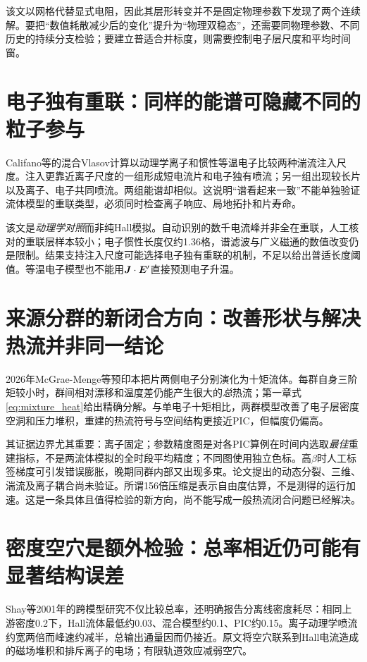 该文以网格代替显式电阻，因此其层形转变并不是固定物理参数下发现了两个连续解。要把“数值耗散减少后的变化”提升为“物理双稳态”，还需要同物理参数、不同历史的持续分支检验；要建立普适合并标度，则需要控制电子层尺度和平均时间窗。

\section{电子独有重联：同样的能谱可隐藏不同的粒子参与}
Califano等的混合Vlasov计算以动理学离子和惯性等温电子比较两种湍流注入尺度。注入更靠近离子尺度的一组形成短电流片和电子独有喷流；另一组出现较长片以及离子、电子共同喷流。两组能谱却相似。这说明“谱看起来一致”不能单独验证流体模型的重联类型，必须同时检查离子响应、局地拓扑和片寿命。\citep{L267}

该文是\emph{动理学对照}而非纯Hall模拟。自动识别的数千电流峰并非全在重联，人工核对的重联层样本较小；电子惯性长度仅约1.36格，谱滤波与广义磁通的数值改变仍是限制。结果支持注入尺度可能选择电子独有重联的机制，不足以给出普适长度阈值。等温电子模型也不能用$\bm{J}\cdot\bm{E}'$直接预测电子升温。

\section{来源分群的新闭合方向：改善形状与解决热流并非同一结论}
2026年McGrae-Menge等预印本把片两侧电子分别演化为十矩流体。每群自身三阶矩较小时，群间相对漂移和温度差仍能产生很大的\emph{总}热流；第一章式\eqref{eq:mixture_heat}给出精确分解。与单电子十矩相比，两群模型改善了电子层密度空洞和压力堆积，重建的热流符号与空间结构更接近PIC，但幅度仍偏高。\citep{F635}

其证据边界尤其重要：离子固定；参数精度图是对各PIC算例在时间内选取\emph{最佳}重建指标，不是两流体模拟的全时段平均精度；不同图使用独立色标。高$\beta$时人工标签梯度可引发错误膨胀，晚期同群内部又出现多束。论文提出的动态分裂、三维、湍流及离子耦合尚未验证。所谓156倍压缩是表示自由度估算，不是测得的运行加速。这是一条具体且值得检验的新方向，尚不能写成一般热流闭合问题已经解决。

\section{密度空穴是额外检验：总率相近仍可能有显著结构误差}
Shay等2001年的跨模型研究不仅比较总率，还明确报告分离线密度耗尽：相同上游密度0.2下，Hall流体最低约0.03、混合模型约0.1、PIC约0.15。离子动理学喷流约宽两倍而峰速约减半，总输出通量因而仍接近。原文将空穴联系到Hall电流造成的磁场堆积和排斥离子的电场；有限轨道效应减弱空穴。\citep{Shay2001}

